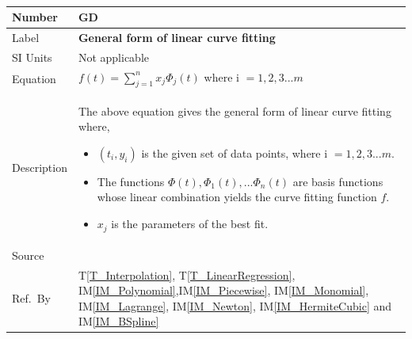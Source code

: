 \documentclass[12pt]{article}
\newcommand{\colAwidth}{0.13\textwidth}
\newcommand{\colBwidth}{0.82\textwidth}
\newcounter{defnum} %
\newcommand{\tref}[1]{T\ref{#1}}
\newcommand{\iref}[1]{IM\ref{#1}}
\begin{document}
~\newline
\noindent
\begin{minipage}{\textwidth}
	\renewcommand*{\arraystretch}{1.5}
	\begin{tabular}{| p{\colAwidth} | p{\colBwidth}|}
		\hline
		\rowcolor[gray]{0.9}
		Number& GD{defnum}\thedefnum
		\label{GD_CurveFitEq}\\
		\hline
		Label &\bf General form of linear curve fitting\\
		\hline
		SI Units& Not applicable\\
		\hline
		Equation & $f(t) = \sum_{j=1}^{n}x_j \Phi_j (t)$ where i $= 1,2,3...m$\\
		\hline
		Description & The above equation gives the general form of linear curve fitting where,
		\begin{itemize}
			\item $(t_i,y_i)$ is the given set of data points, where i $= 1,2, 3...m$.
			\item The functions $\Phi(t), \Phi_1(t), ... \Phi_n(t)$ are basis functions whose linear combination yields the curve fitting function $f$.
			\item $x_j$ is the parameters of the best fit.
		\end{itemize}\\
		\hline
		Source & ~\cite{Health1997}\\
		\hline
		
		Ref.\ By &\tref{T_Interpolation}, \tref{T_LinearRegression}, \iref{IM_Polynomial},\iref{IM_Piecewise}, \iref{IM_Monomial}, \iref{IM_Lagrange}, \iref{IM_Newton}, \iref{IM_HermiteCubic} and \iref{IM_BSpline}\\
		\hline
	\end{tabular}
\end{minipage}\\
\end{document}

